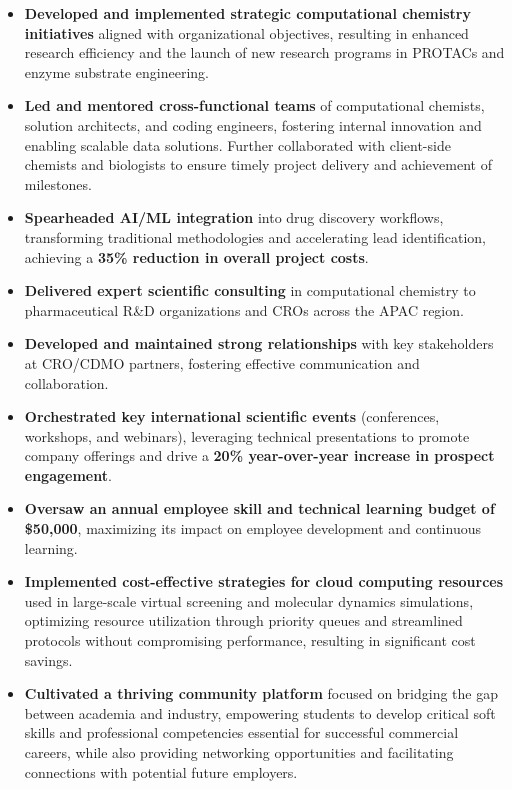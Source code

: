 \documentclass[10pt,a4paper,ragged2e,withhyper]{altacv}
\begin{document}
\begin{itemize}
    \item \textbf{Developed and implemented strategic computational chemistry initiatives} aligned with organizational objectives, resulting in enhanced research efficiency and the launch of new research programs in PROTACs and enzyme substrate engineering.
    \item \textbf{Led and mentored cross-functional teams} of computational chemists, solution architects, and coding engineers, fostering internal innovation and enabling scalable data solutions. Further collaborated with client-side chemists and biologists to ensure timely project delivery and achievement of milestones.
    \item \textbf{Spearheaded AI/ML integration} into drug discovery workflows, transforming traditional methodologies and accelerating lead identification, achieving a \textbf{35\% reduction in overall project costs}.
    \item \textbf{Delivered expert scientific consulting} in computational chemistry to pharmaceutical R\&D organizations and CROs across the APAC region.
    \item \textbf {Developed and maintained strong relationships} with key stakeholders at CRO/CDMO partners, fostering effective communication and collaboration.
    \item \textbf{Orchestrated key international scientific events} (conferences, workshops, and webinars), leveraging technical presentations to promote company offerings and drive a \textbf{20\% year-over-year increase in prospect engagement}.
    \item \textbf{Oversaw an annual employee skill and technical learning budget of \$50,000}, maximizing its impact on employee development and continuous learning.
    \item \textbf{Implemented cost-effective strategies for cloud computing resources} used in large-scale virtual screening and molecular dynamics simulations, optimizing resource utilization through priority queues and streamlined protocols without compromising performance, resulting in significant cost savings.
   \item \textbf{Cultivated a thriving community platform} focused on bridging the gap between academia and industry, empowering students to develop critical soft skills and professional competencies essential for successful commercial careers, while also providing networking opportunities and facilitating connections with potential future employers.
\end{itemize}
\end{document}
